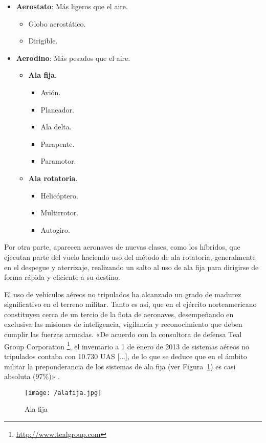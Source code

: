 \begin{itemize}
\item \textbf{Aerostato}: Más ligeros que el aire.
	\begin{itemize}
	\item Globo aerostático.
	\item Dirigible.
	\end{itemize}
\item \textbf{Aerodino}: Más pesados que el aire.
	\begin{itemize}
	\item \textbf{Ala fija}.
		\begin{itemize}
		\item Avión.
		\item Planeador.
		\item Ala delta.
		\item Parapente.
		\item Paramotor.
		\end{itemize}
	\item \textbf{Ala rotatoria}.
		\begin{itemize}
		\item Helicóptero.
		\item Multirrotor.
		\item Autogiro.
		\end{itemize}
	\end{itemize}
\end{itemize}

Por otra parte, aparecen aeronaves de nuevas clases, como los híbridos, que ejecutan parte del vuelo haciendo uso del método de ala rotatoria, generalmente en el despegue y aterrizaje, realizando un salto al uso de ala fija para dirigirse de forma rápida y eficiente a su destino.

El uso de vehículos aéreos no tripulados ha alcanzado un grado de madurez significativo en el terreno militar. Tanto es así, que 
en el ejército norteamericano constituyen cerca de un tercio de la flota de aeronaves, desempeñando en exclusiva las misiones 
de inteligencia, vigilancia y reconocimiento que deben cumplir las fuerzas armadas. «De acuerdo con la consultora de defensa Teal Group Corporation \footnote{\url{http://www.tealgroup.com}}, el inventario a 1 de enero de 2013 de sistemas aéreos no tripulados contaba con 10.730 \acs{UAS} [...], de lo que se deduce que en el ámbito militar la preponderancia de los sistemas de ala fija (ver Figura~\ref{fig:alafija}) es casi absoluta (97\%)» \cite{dron2}.


\begin{figure}[!h]
\begin{center}
\texttt{[image: /alafija.jpg]}
\caption[Sistema de ala fija]{Ala fija}
\label{fig:alafija}
\end{center}
\end{figure}

